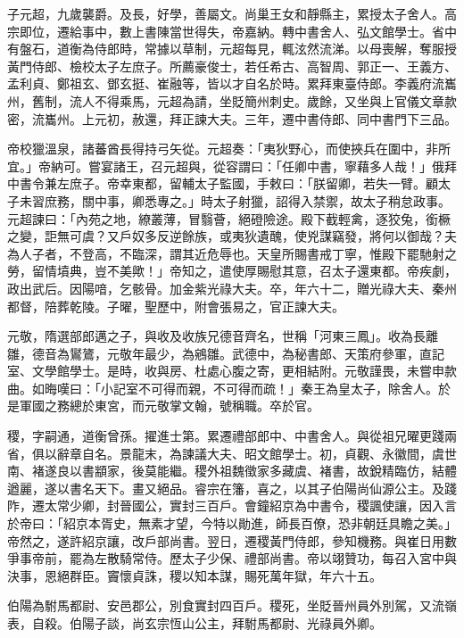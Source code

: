 \begin{pinyinscope}
 子元超，九歲襲爵。及長，好學，善屬文。尚巢王女和靜縣主，累授太子舍人。高宗即位，遷給事中，數上書陳當世得失，帝嘉納。轉中書舍人、弘文館學士。省中有盤石，道衡為侍郎時，常據以草制，元超每見，輒泫然流涕。以母喪解，奪服授黃門侍郎、檢校太子左庶子。所薦豪俊士，若任希古、高智周、郭正一、王義方、孟利貞、鄭祖玄、鄧玄挺、崔融等，皆以才自名於時。累拜東臺侍郎。李義府流巂州，舊制，流人不得乘馬，元超為請，坐貶簡州刺史。歲餘，又坐與上官儀文章款密，流巂州。上元初，赦還，拜正諫大夫。三年，遷中書侍郎、同中書門下三品。



 帝校獵溫泉，諸蕃酋長得持弓矢從。元超奏：「夷狄野心，而使挾兵在圍中，非所宜。」帝納可。嘗宴諸王，召元超與，從容謂曰：「任卿中書，寧藉多人哉！」俄拜中書令兼左庶子。帝幸東都，留輔太子監國，手敕曰：「朕留卿，若失一臂。顧太子未習庶務，關中事，卿悉專之。」時太子射獵，詔得入禁禦，故太子稍怠政事。元超諫曰：「內苑之地，繚叢薄，冒翳薈，絕磴險途。殿下截輕禽，逐狡兔，銜橛之變，詎無可虞？又戶奴多反逆餘族，或夷狄遺醜，使兇謀竊發，將何以御哉？夫為人子者，不登高，不臨深，謂其近危辱也。天皇所賜書戒丁寧，惟殿下罷馳射之勞，留情墳典，豈不美歟！」帝知之，遣使厚賜慰其意，召太子還東都。帝疾劇，政出武后。因陽喑，乞骸骨。加金紫光祿大夫。卒，年六十二，贈光祿大夫、秦州都督，陪葬乾陵。子曜，聖歷中，附會張易之，官正諫大夫。



 元敬，隋選部郎邁之子，與收及收族兄德音齊名，世稱「河東三鳳」。收為長離雛，德音為鸑鷟，元敬年最少，為鵷雛。武德中，為秘書郎、天策府參軍，直記室、文學館學士。是時，收與房、杜處心腹之寄，更相結附。元敬謹畏，未嘗申款曲。如晦嘆曰：「小記室不可得而親，不可得而疏！」秦王為皇太子，除舍人。於是軍國之務總於東宮，而元敬掌文翰，號稱職。卒於官。



 稷，字嗣通，道衡曾孫。擢進士第。累遷禮部郎中、中書舍人。與從祖兄曜更踐兩省，俱以辭章自名。景龍末，為諫議大夫、昭文館學士。初，貞觀、永徽間，虞世南、褚遂良以書顓家，後莫能繼。稷外祖魏徵家多藏虞、褚書，故銳精臨仿，結體遒麗，遂以書名天下。畫又絕品。睿宗在籓，喜之，以其子伯陽尚仙源公主。及踐阼，遷太常少卿，封晉國公，實封三百戶。會鐘紹京為中書令，稷諷使讓，因入言於帝曰：「紹京本胥史，無素才望，今特以勛進，師長百僚，恐非朝廷具瞻之美。」帝然之，遂許紹京讓，改戶部尚書。翌日，遷稷黃門侍郎，參知機務。與崔日用數爭事帝前，罷為左散騎常侍。歷太子少保、禮部尚書。帝以翊贊功，每召入宮中與決事，恩絕群臣。竇懷貞誅，稷以知本謀，賜死萬年獄，年六十五。



 伯陽為駙馬都尉、安邑郡公，別食實封四百戶。稷死，坐貶晉州員外別駕，又流嶺表，自殺。伯陽子談，尚玄宗恆山公主，拜駙馬都尉、光祿員外卿。




\end{pinyinscope}
